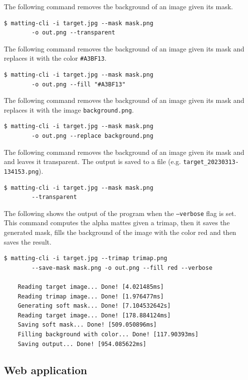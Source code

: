 \documentclass[a4paper]{article}
\begin{document}
The following command removes the background of an image
given its mask.
\begin{lstlisting}[style=boxed]
    $ matting-cli -i target.jpg --mask mask.png
        -o out.png --transparent
\end{lstlisting}

The following command removes the background of an image
given its mask and replaces it with the color \texttt{\#A3BF13}.
\begin{lstlisting}[style=boxed]
    $ matting-cli -i target.jpg --mask mask.png
        -o out.png --fill "#A3BF13"
\end{lstlisting}

The following command removes the background of an image
given its mask and replaces it with the image \texttt{background.png}.
\begin{lstlisting}[style=boxed]
    $ matting-cli -i target.jpg --mask mask.png
        -o out.png --replace background.png
\end{lstlisting}

The following command removes the background of an image
given its mask and and leaves it transparent. The output is saved to a file
(e.g. \texttt{target\_20230313-134153.png}).
\begin{lstlisting}[style=boxed]
    $ matting-cli -i target.jpg --mask mask.png
        --transparent
\end{lstlisting}

The following shows the output of the program when the \texttt{--verbose}
flag is set. This command computes the alpha mattes given a trimap,
then it saves the generated mask, fills the background of the image
with the color red and then saves the result.
\begin{lstlisting}[style=boxed]
    $ matting-cli -i target.jpg --trimap trimap.png
        --save-mask mask.png -o out.png --fill red --verbose
    
    Reading target image... Done! [4.021485ms]
    Reading trimap image... Done! [1.976477ms]
    Generating soft mask... Done! [7.104532642s]
    Reading target image... Done! [178.884124ms]
    Saving soft mask... Done! [509.050896ms]
    Filling background with color... Done! [117.90393ms]
    Saving output... Done! [954.085622ms]
\end{lstlisting}

\pagebreak

\subsection{Web application}
\end{document}

